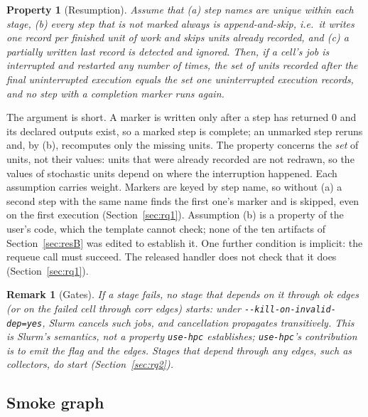 \documentclass[pdflatex,sn-mathphys-num]{sn-jnl}
\theoremstyle{thmstyletwo}%
\newtheorem{remark}{Remark}%
\newtheorem{property}{Property}%
\theoremstyle{thmstylethree}%
\newcommand{\tool}{\texttt{use-hpc}}
\newcommand{\code}[1]{\texttt{#1}}
\begin{document}
\begin{property}[Resumption]\label{prop:resume}
Assume that (a) step names are unique within each stage, (b) every step that is not marked \emph{always} is \emph{append-and-skip}, i.e.\ it writes one record per finished unit of work and skips units already recorded, and (c) a partially written last record is detected and ignored. Then, if a cell's job is interrupted and restarted any number of times, the set of units recorded after the final uninterrupted execution equals the set one uninterrupted execution records, and no step with a completion marker runs again.
\end{property}
\noindent The argument is short. A marker is written only after a step has returned 0 and its declared outputs exist, so a marked step is complete; an unmarked step reruns and, by (b), recomputes only the missing units. The property concerns the \emph{set} of units, not their values: units that were already recorded are not redrawn, so the values of stochastic units depend on where the interruption happened. Each assumption carries weight. Markers are keyed by step name, so without (a) a second step with the same name finds the first one's marker and is skipped, even on the first execution (Section~\ref{sec:rq1}). Assumption (b) is a property of the user's code, which the template cannot check; none of the ten artifacts of Section~\ref{sec:resB} was edited to establish it. One further condition is implicit: the requeue call must succeed. The released handler does not check that it does (Section~\ref{sec:rq1}).

\begin{remark}[Gates]\label{rem:gate}
If a stage fails, no stage that depends on it through \emph{ok} edges (or on the failed cell through \emph{corr} edges) starts: under \code{-{}-kill-on-invalid-dep=yes}, Slurm cancels such jobs, and cancellation propagates transitively. This is Slurm's semantics, not a property \tool{} establishes; \tool{}'s contribution is to emit the flag and the edges. Stages that depend through \emph{any} edges, such as collectors, do start (Section~\ref{sec:rq2}).
\end{remark}

\subsection{Smoke graph}\label{sec:smoke}
\end{document}
